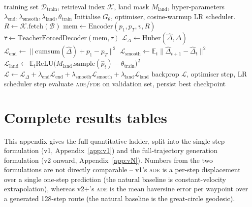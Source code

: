 \documentclass[oneside, a4paper, onecolumn, 11pt]{article}
\newcommand{\ade}{\textsc{ade}}
\newcommand{\fde}{\textsc{fde}}
\begin{document}
\begin{algorithm}[H]
\caption{Training loop for the production model.}
\label{alg:train}
\begin{algorithmic}[1]
\REQUIRE training set $\mathcal{D}_{\mathrm{train}}$,
         retrieval index $\mathcal{K}$,
         land mask $M_{\mathrm{land}}$,
         hyper-parameters
         $\lambda_{\mathrm{end}},\lambda_{\mathrm{smooth}},
          \lambda_{\mathrm{land}},\theta_{\mathrm{train}}$
\STATE Initialise $G_\theta$, optimiser, cosine-warmup LR scheduler.
    \STATE $R \leftarrow \mathcal{K}.\text{fetch}(\mathcal{B})$
    \STATE $\mathrm{mem} \leftarrow
            \text{Encoder}(p_1, p_T, v, R)$
    \STATE $\hat\tau \leftarrow
            \text{TeacherForcedDecoder}(\mathrm{mem}, \tau)$
    \STATE $\mathcal{L}_\Delta \leftarrow
            \text{Huber}(\hat\Delta, \Delta)$
    \STATE $\mathcal{L}_{\mathrm{end}} \leftarrow
            \| \mathrm{cumsum}(\hat\Delta) + p_1 - p_T \|^2$
    \STATE $\mathcal{L}_{\mathrm{smooth}} \leftarrow
            \mathbb{E}_t \|\hat\Delta_{t+1} - \hat\Delta_t\|^2$
    \STATE $\mathcal{L}_{\mathrm{land}} \leftarrow
            \mathbb{E}_t \mathrm{ReLU}\bigl(M_{\mathrm{land}}.\text{sample}(\hat p_t)
                                    - \theta_{\mathrm{train}}\bigr)^2$
    \STATE $\mathcal{L} \leftarrow
            \mathcal{L}_\Delta
            + \lambda_{\mathrm{end}}\mathcal{L}_{\mathrm{end}}
            + \lambda_{\mathrm{smooth}}\mathcal{L}_{\mathrm{smooth}}
            + \lambda_{\mathrm{land}}\mathcal{L}_{\mathrm{land}}$
    \STATE backprop $\mathcal{L}$, optimiser step, LR scheduler step
  \ENDFOR
  \STATE evaluate \ade/\fde{} on validation set, persist best checkpoint
\ENDFOR
\end{algorithmic}
\end{algorithm}

\section{Complete results tables}\label{app:results}

This appendix gives the full quantitative ladder, split into the
single-step formulation (v1, Appendix~\ref{app:v1}) and the
full-trajectory generation formulation (v2 onward,
Appendix~\ref{app:vN}).  Numbers from the two formulations are not
directly comparable -- v1's \ade{} is a per-step displacement over a
single one-step prediction (the natural baseline is constant-velocity
extrapolation), whereas v2+'s \ade{} is the mean haversine error per
waypoint over a generated 128-step route (the natural baseline is the
great-circle geodesic).
\end{document}
